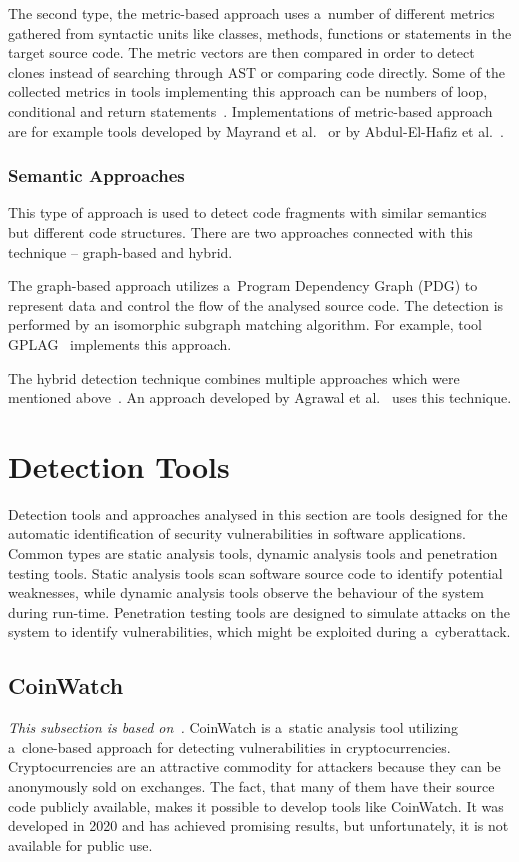     The second type, the metric-based approach uses a~number of different metrics gathered from syntactic units
    like classes, methods, functions or statements in the target source code. The metric vectors are then compared
    in order to detect clones instead of searching through AST or comparing code directly. Some of the collected
    metrics in tools implementing this approach can be numbers of loop, conditional and return
    statements~\cite{CloneDetectionTechniques, CodeClonesSurvey}.
    Implementations of metric-based approach are for example tools developed by Mayrand et al.~\cite{MBMayrand}
    or by Abdul-El-Hafiz et al.~\cite{MDAbdul}.

  \subsubsection*{Semantic Approaches}
    This type of approach is used to detect code fragments with similar semantics but different code structures.
    There are two approaches connected with this technique -- graph-based and hybrid.

    The graph-based approach utilizes a~Program Dependency Graph (PDG) to represent data and control
    the flow of the analysed source code. The detection is performed by an isomorphic subgraph matching algorithm.
    For example, tool GPLAG~\cite{GPLAG} implements this approach.

    The hybrid detection technique combines multiple approaches which were mentioned
    above~\cite{CloneDetectionTechniques, CodeClonesSurvey}. An approach developed by Agrawal et
    al.~\cite{HybridAgrawal} uses this technique.

\section{Detection Tools}
Detection tools and approaches analysed in this section are tools designed for the automatic identification of
security vulnerabilities in software applications. Common types are static analysis tools,
dynamic analysis tools and penetration testing tools. Static analysis tools scan software source code
to identify potential weaknesses, while dynamic analysis tools observe the behaviour of the system during
run-time. Penetration testing tools are designed to simulate attacks on the system to identify
vulnerabilities, which might be exploited during a~cyberattack.

  \subsection*{CoinWatch}
    \textit{This subsection is based on~\cite{CoinWatch}.}
    CoinWatch is a~static analysis tool utilizing a~clone-based approach for detecting vulnerabilities
    in cryptocurrencies. Cryptocurrencies are an attractive commodity for attackers because they can be
    anonymously sold on exchanges. The fact, that many of them have their source code publicly available,
    makes it possible to develop tools like CoinWatch. It was developed in 2020 and has achieved promising
    results, but unfortunately, it is not available for public use.

